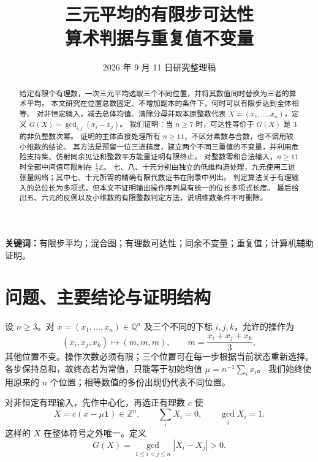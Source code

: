 \documentclass[UTF8,fontset=fandol,zihao=-4,a4paper]{ctexart}
\title{\heiti 三元平均的有限步可达性\\[0.3em]
  \large 算术判据与重复值不变量}
\author{}
\date{2026 年 9 月 11 日\quad 研究整理稿}
\numberwithin{equation}{section}
\theoremstyle{definition}
\newcommand{\Z}{\mathbb Z}
\newcommand{\Q}{\mathbb Q}
\newcommand{\one}{\boldsymbol 1}
\begin{document}
\maketitle
\thispagestyle{plain}
\begin{abstract}
给定有限个有理数，一次三元平均选取三个不同位置，并将其数值同时替换为三者的算术平均。
本文研究在位置总数固定、不增加副本的条件下，何时可以有限步达到全体相等。
对非恒定输入，减去总体均值、清除分母并取本原整数代表
$X=(x_1,\ldots,x_n)$，定义 $G(X)=\gcd_{i,j}(x_i-x_j)$。
我们证明：当 $n\ge7$ 时，可达性等价于 $G(X)$ 是 $3$ 的非负整数次幂。
证明的主体直接处理所有 $n\ge11$，不区分素数与合数，也不调用较小维数的结论。
其方法是预留一位三进精度，建立两个不同三重值的不变量，并利用危险支持集、仿射同余见证和整数平方能量证明有限终止。
对整数零和合法输入，$n\ge11$ 时全部中间值可限制在 $\frac13\Z$。
七、八、十元分别由独立的低维构造处理，九元使用三进张量网络；其中七、十元所需的精确有限代数证书在附录中列出。
判定算法关于有理输入的总位长为多项式，但本文不证明输出操作序列具有统一的位长多项式长度。
最后给出五、六元的反例以及小维数的有限整数判定方法，说明维数条件不可删除。
\end{abstract}
\noindent\textbf{关键词：}有限步平均；混合图；有理数可达性；同余不变量；重复值；计算机辅助证明。

\tableofcontents
\newpage

\section{问题、主要结论与证明结构}

设 $n\ge3$。对 $x=(x_1,\ldots,x_n)\in\Q^n$ 及三个不同的下标
$i,j,k$，允许的操作为
\begin{equation}\label{eq:atom}
 (x_i,x_j,x_k)\longmapsto(m,m,m),\qquad
 m=\frac{x_i+x_j+x_k}{3},
\end{equation}
其他位置不变。操作次数必须有限；三个位置可在每一步根据当前状态重新选择。
各步保持总和，故终态若为常值，只能等于初始均值
$\mu=n^{-1}\sum_i x_i$。
我们始终使用原来的 $n$ 个位置；相等数值的多份出现仍代表不同位置。

对非恒定有理输入，先作中心化，再选正有理数 $c$ 使
\begin{equation}\label{eq:normalization}
 X=c(x-\mu\one)\in\Z^n,\qquad
 \sum_i X_i=0,\qquad \gcd_i X_i=1.
\end{equation}
这样的 $X$ 在整体符号之外唯一。定义
\begin{equation}\label{eq:G}
 G(X)=\gcd_{1\le i<j\le n}|X_i-X_j|>0.
\end{equation}
\end{document}
